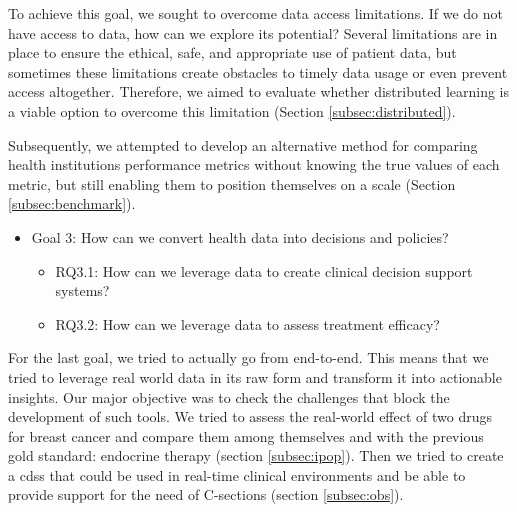 To achieve this goal, we sought to overcome data access limitations. If we do not have access to data, how can we explore its potential? Several limitations are in place to ensure the ethical, safe, and appropriate use of patient data, but sometimes these limitations create obstacles to timely data usage or even prevent access altogether. Therefore, we aimed to evaluate whether distributed learning is a viable option to overcome this limitation (Section \ref{subsec:distributed}).

Subsequently, we attempted to develop an alternative method for comparing health institutions performance metrics without knowing the true values of each metric, but still enabling them to position themselves on a scale (Section \ref{subsec:benchmark}).

\begin{itemize}
    \item Goal 3: How can we convert health data into decisions and policies?
    \begin{itemize}
        \item RQ3.1: How can we leverage data to create clinical decision support systems?
        \item RQ3.2: How can we leverage data to assess treatment efficacy?
    \end{itemize}    
\end{itemize}

For the last goal, we tried to actually go from end-to-end. This means that we tried to leverage real world data in its raw form and transform it into actionable insights. Our major objective was to check the challenges that block the development of such tools. We tried to assess the real-world effect of two drugs for breast cancer and compare them among themselves and with the previous gold standard: endocrine therapy (section \ref{subsec:ipop}). Then we tried to create a \ac{cdss} that could be used in real-time clinical environments and be able to provide support for the need of C-sections (section \ref{subsec:obs}). 